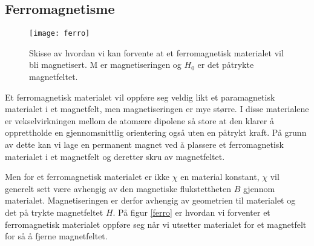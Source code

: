 \documentclass[norsk,a4paper,12pt]{article}
\begin{document}
\subsection{Ferromagnetisme}
\begin{wrapfigure}{r}{0.5\textwidth}
  \begin{center}
    \texttt{[image: ferro]}
  \end{center}
  \caption[Magnetiseringen av ferromagneter]{Skisse av hvordan vi kan forvente at et ferromagnetisk materialet vil bli magnetisert. M er magnetiseringen og $H_0$ er det påtrykte magnetfeltet.}
  \label{ferro}
\end{wrapfigure}
Et ferromagnetisk materialet vil oppføre seg veldig likt et paramagnetisk materialet i et magnetfelt, men magnetiseringen er mye større. I disse materialene er vekselvirkningen mellom de atomære dipolene så store at den klarer å opprettholde en gjennomsnittlig orientering også uten en påtrykt kraft. På grunn av dette kan vi lage en permanent magnet ved å plassere et ferromagnetisk materialet i et magnetfelt og deretter skru av magnetfeltet. 

Men for et ferromagnetisk materialet er ikke $\chi$ en material konstant, $\chi$ vil generelt sett være avhengig av den magnetiske flukstettheten $B$ gjennom materialet. Magnetiseringen er derfor avhengig av geometrien til materialet og det på trykte magnetfeltet $H$. På figur \vref{ferro} er hvordan vi forventer et ferromagnetisk materialet oppføre seg når vi utsetter materialet for et magnetfelt for så å fjerne magnetfeltet. 
\end{document}
